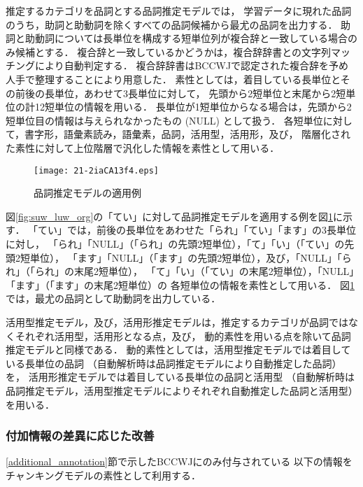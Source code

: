 \documentclass[japanese]{jnlp_1.4}
\begin{document}
推定するカテゴリを品詞とする品詞推定モデルでは，
学習データに現れた品詞のうち，助詞と助動詞を除くすべての品詞候補から最尤の品詞を出力する．
助詞と助動詞については長単位を構成する短単位列が複合辞と一致している場合のみ候補とする．
複合辞と一致しているかどうかは，複合辞辞書との文字列マッチングにより自動判定する．
複合辞辞書はBCCWJで認定された複合辞を予め人手で整理することにより用意した．
素性としては，着目している長単位とその前後の長単位，あわせて3長単位に対して，
先頭から2短単位と末尾から2短単位の計12短単位の情報を用いる．
長単位が1短単位からなる場合は，先頭から2短単位目の情報は与えられなかったもの (NULL) として扱う．
各短単位に対して，書字形，語彙素読み，語彙素，品詞，活用型，活用形，及び，
階層化された素性に対して上位階層で汎化した情報を素性として用いる．

\begin{figure}[b]
\begin{center}
\texttt{[image: 21-2iaCA13f4.eps]}
\end{center}
\caption{品詞推定モデルの適用例}
\label{post_feature}
\end{figure}

図\ref{fig:suw_luw_org}の「てい」に対して品詞推定モデルを適用する例を図\ref{post_feature}に示す．
「てい」では，前後の長単位をあわせた「られ」「てい」「ます」の3長単位に対し，
「られ」「NULL」（「られ」の先頭2短単位），「て」「い」（「てい」の先頭2短単位），
「ます」「NULL」（「ます」の先頭2短単位），及び，「NULL」「られ」（「られ」の末尾2短単位），
「て」「い」（「てい」の末尾2短単位），「NULL」「ます」（「ます」の末尾2短単位）の
各短単位の情報を素性として用いる．
図\ref{post_feature}では，最尤の品詞として助動詞を出力している．

活用型推定モデル，及び，活用形推定モデルは，推定するカテゴリが品詞ではなくそれぞれ活用型，活用形となる点，及び，
動的素性を用いる点を除いて品詞推定モデルと同様である．
動的素性としては，活用型推定モデルでは着目している長単位の品詞
（自動解析時は品詞推定モデルにより自動推定した品詞）を，
活用形推定モデルでは着目している長単位の品詞と活用型
（自動解析時は品詞推定モデル，活用型推定モデルによりそれぞれ自動推定した品詞と活用型）を用いる．


\subsubsection{付加情報の差異に応じた改善}
\label{apply_additional_annotation}

\ref{additional_annotation}節で示したBCCWJにのみ付与されている
以下の情報をチャンキングモデルの素性として利用する．
\end{document}
